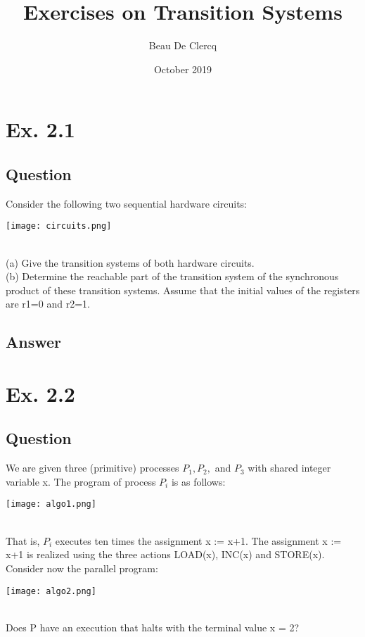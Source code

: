\documentclass[12pt]{article}
\title{Exercises on Transition Systems}
\author{Beau De Clercq}
\date{October 2019}
\begin{document}
\maketitle{}


\clearpage
\newpage

\section*{Ex. 2.1}
\subsection*{Question}
Consider the following two sequential hardware circuits:\\
\begin{centering}
	\texttt{[image: circuits.png]}
\end{centering}
\\
(a) Give the transition systems of both hardware circuits.\\
(b) Determine the reachable part of the transition system of the synchronous product of these
transition systems. Assume that the initial values of the registers are r1=0 and r2=1.

\subsection*{Answer}

\newpage

\section*{Ex. 2.2}
\subsection*{Question}
We are given three (primitive) processes $P_1, P_2,$ and $P_3$ with shared integer variable x. The program of process $P_i$ is as follows:\\
\begin{centering}
	\texttt{[image: algo1.png]}
\end{centering}
\\
That is, $P_i$ executes ten times the assignment x := x+1. The assignment x := x+1 is realized using the three actions LOAD(x), INC(x) and STORE(x). Consider now the parallel program:\\
\begin{centering}
	\texttt{[image: algo2.png]}
\end{centering}
\\
Does P have an execution that halts with the terminal value x = 2?
\end{document}
